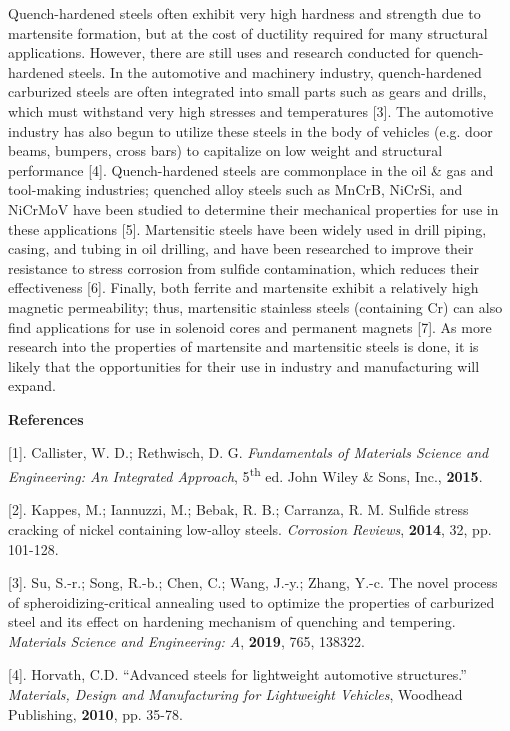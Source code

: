 \documentclass[]{article}
\begin{document}
Quench-hardened steels often exhibit very high hardness and strength due
to martensite formation, but at the cost of ductility required for many
structural applications. However, there are still uses and research
conducted for quench-hardened steels. In the automotive and machinery
industry, quench-hardened carburized steels are often integrated into
small parts such as gears and drills, which must withstand very high
stresses and temperatures {[}3{]}. The automotive industry has also
begun to utilize these steels in the body of vehicles (e.g. door beams,
bumpers, cross bars) to capitalize on low weight and structural
performance {[}4{]}. Quench-hardened steels are commonplace in the oil
\& gas and tool-making industries; quenched alloy steels such as MnCrB,
NiCrSi, and NiCrMoV have been studied to determine their mechanical
properties for use in these applications {[}5{]}. Martensitic steels
have been widely used in drill piping, casing, and tubing in oil
drilling, and have been researched to improve their resistance to stress
corrosion from sulfide contamination, which reduces their effectiveness
{[}6{]}. Finally, both ferrite and martensite exhibit a relatively high
magnetic permeability; thus, martensitic stainless steels (containing
Cr) can also find applications for use in solenoid cores and permanent
magnets {[}7{]}. As more research into the properties of martensite and
martensitic steels is done, it is likely that the opportunities for
their use in industry and manufacturing will expand.

\textbf{References}

{[}1{]}. Callister, W. D.; Rethwisch, D. G. \emph{Fundamentals of
Materials Science and Engineering: An Integrated Approach},
5\textsuperscript{th} ed. John Wiley \& Sons, Inc., \textbf{2015}.

{[}2{]}. Kappes, M.; Iannuzzi, M.; Bebak, R. B.; Carranza, R. M. Sulfide
stress cracking of nickel containing low-alloy steels. \emph{Corrosion
Reviews}, \textbf{2014}, 32, pp. 101-128.

{[}3{]}. Su, S.-r.; Song, R.-b.; Chen, C.; Wang, J.-y.; Zhang, Y.-c. The
novel process of spheroidizing-critical annealing used to optimize the
properties of carburized steel and its effect on hardening mechanism of
quenching and tempering. \emph{Materials Science and Engineering: A},
\textbf{2019}, 765, 138322.

{[}4{]}. Horvath, C.D. ``Advanced steels for lightweight automotive
structures.'' \emph{Materials, Design and Manufacturing for Lightweight
Vehicles}, Woodhead Publishing, \textbf{2010}, pp. 35-78.
\end{document}
